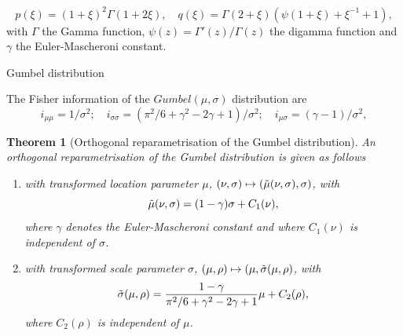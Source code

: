 \documentclass[10pt,a4paper]{amsart}
\newtheorem{theorem}{Theorem}
\providecommand{\subsection}{}
\begin{document}
\begin{equation*}
p(\xi)=(1+\xi)^2 \Gamma(1+2 \xi), \quad q(\xi)=\Gamma(2+\xi)\left(\psi(1+\xi)+\xi^{-1}+1\right),
\end{equation*}
with $\Gamma$ the Gamma function, $\psi(z) = \Gamma'(z)/\Gamma(z)$ the digamma function and $\gamma$ the Euler-Mascheroni constant.

\subsection{Gumbel distribution}\label{sec:gumbel_fisher}

    The Fisher information of the $Gumbel(\mu,\sigma)$ distribution are
\begin{equation*}
    i_{\mu\mu} = 1/\sigma^2; \quad i_{\sigma \sigma} = (\pi^2/6+\gamma^2 - 2 \gamma +1)/\sigma^2; \quad i_{\mu \sigma} = (\gamma - 1)/\sigma^2,
\end{equation*}

\begin{theorem}[Orthogonal reparametrisation of the Gumbel distribution]\label{thm:Gumbel}
    An orthogonal reparametrisation of the Gumbel distribution is given as follows
\begin{enumerate}
    \item with transformed location parameter $\mu$,  $(\nu,\sigma) \mapsto (\Tilde{\mu}(\nu,\sigma),\sigma)$, with
    \begin{equation*}
        \Tilde{\mu}(\nu,\sigma) = (1- \gamma)\sigma + C_1(\nu),
    \end{equation*}
    where $\gamma$ denotes the Euler-Mascheroni constant and where $C_1(\nu)$ is independent of $\sigma$.
    \item with transformed scale parameter $\sigma$, $(\mu,\rho) \mapsto (\mu,\Tilde{\sigma}(\mu,\rho)$, with
    \begin{equation*}
        \Tilde{\sigma}(\mu,\rho) = \frac{1- \gamma}{\pi^2/6+\gamma^2 -2\gamma+1}\mu + C_2(\rho),
    \end{equation*}
    where $C_2(\rho)$ is independent of $\mu$.
\end{enumerate}
\end{theorem}
\end{document}
